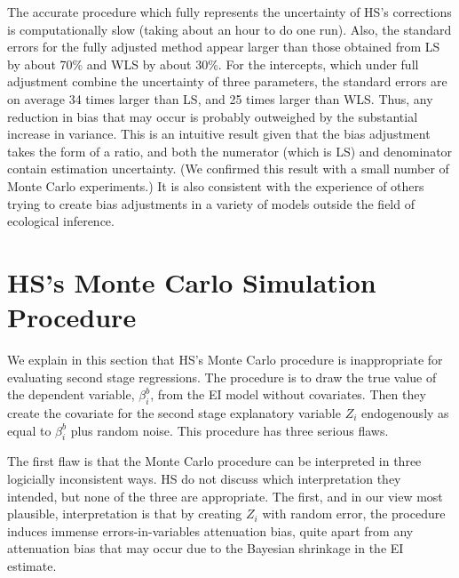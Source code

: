 \documentclass[11pt,titlepage]{article}
\begin{document}
The accurate procedure which fully represents the uncertainty of HS's
corrections is computationally slow (taking about an hour to do one
run).  Also, the standard errors for the fully adjusted method appear
larger than those obtained from LS by about 70\% and WLS by about
30\%.  For the intercepts, which under full adjustment combine the
uncertainty of three parameters, the standard errors are on average 34
times larger than LS, and 25 times larger than WLS.  Thus, any
reduction in bias that may occur is probably outweighed by the
substantial increase in variance.  This is an intuitive result given
that the bias adjustment takes the form of a ratio, and both the
numerator (which is LS) and denominator contain estimation
uncertainty.  (We confirmed this result with a small number of Monte
Carlo experiments.)  It is also consistent with the experience of
others trying to create bias adjustments in a variety of models
outside the field of ecological inference.

\section{HS's Monte Carlo Simulation Procedure}

We explain in this section that HS's Monte Carlo procedure is
inappropriate for evaluating second stage regressions.  The procedure
is to draw the true value of the dependent variable, $\beta_i^b$, from
the EI model without covariates.  Then they create the covariate for
the second stage explanatory variable $Z_i$ endogenously as equal to
$\beta_i^b$ plus random noise.  This procedure has three serious
flaws.

The first flaw is that the Monte Carlo procedure can be interpreted in
three logicially inconsistent ways.  HS do not discuss which
interpretation they intended, but none of the three are appropriate.
The first, and in our view most plausible, interpretation is that by
creating $Z_i$ with random error, the procedure induces immense
errors-in-variables attenuation bias, quite apart from any attenuation
bias that may occur due to the Bayesian shrinkage in the EI estimate.
\end{document}
